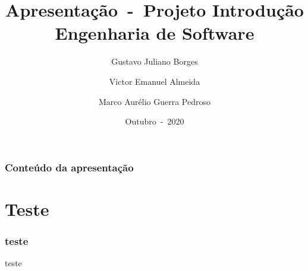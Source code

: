 \documentclass{beamer}
\author{Gustavo Juliano Borges \and Victor Emanuel Almeida \and Marco Aurélio Guerra Pedroso}
\title{Apresentação~-~Projeto Introdução Engenharia de Software}
\date{Outubro~-~2020}
\begin{document}
\frame{\titlepage}
	\begin{frame}
		\frametitle{Conteúdo da apresentação}
		\tableofcontents
	\end{frame}
	\section{Teste}
	\begin{frame}
		\frametitle{teste}
		teste
	\end{frame}
	
\end{document}
